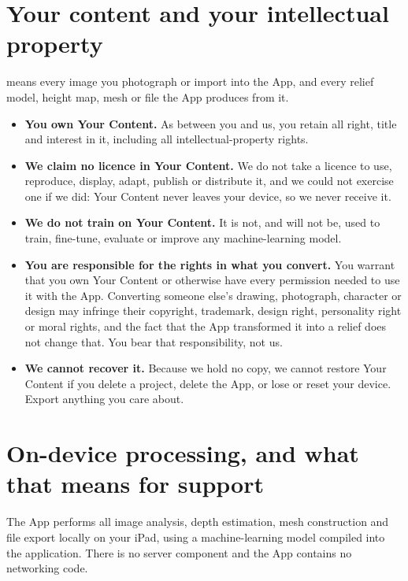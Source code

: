 \documentclass[11pt]{article}
\begin{document}
\section{Your content and your intellectual property}

 means every image you photograph or import into the App, and every
relief model, height map, mesh or file the App produces from it.

\begin{itemize}
  \item \textbf{You own Your Content.} As between you and us, you retain all right,
        title and interest in it, including all intellectual-property rights.
  \item \textbf{We claim no licence in Your Content.} We do not take a licence to use,
        reproduce, display, adapt, publish or distribute it, and we could not exercise
        one if we did: Your Content never leaves your device, so we never receive it.
  \item \textbf{We do not train on Your Content.} It is not, and will not be, used to
        train, fine-tune, evaluate or improve any machine-learning model.
  \item \textbf{You are responsible for the rights in what you convert.} You warrant
        that you own Your Content or otherwise have every permission needed to use it
        with the App. Converting someone else's drawing, photograph, character or
        design may infringe their copyright, trademark, design right, personality
        right or moral rights, and the fact that the App transformed it into a relief
        does not change that. You bear that responsibility, not us.
  \item \textbf{We cannot recover it.} Because we hold no copy, we cannot restore Your
        Content if you delete a project, delete the App, or lose or reset your device.
        Export anything you care about.
\end{itemize}

\section{On-device processing, and what that means for support}

The App performs all image analysis, depth estimation, mesh construction and file
export locally on your iPad, using a machine-learning model compiled into the
application. There is no server component and the App contains no networking code.
\end{document}
